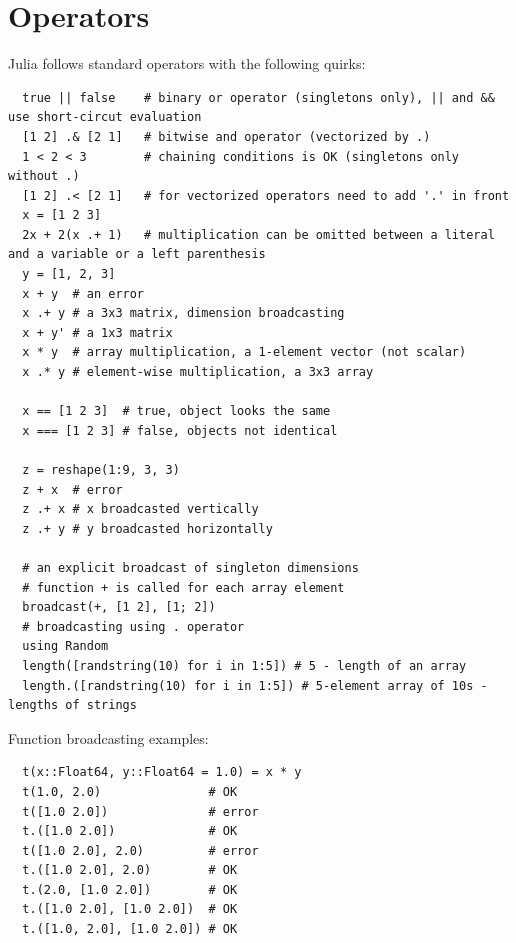 \documentclass[10pt,a4paper]{article}
\begin{document}
\section{Operators}
Julia follows standard operators with the following quirks:
\begin{lstlisting}
  true || false    # binary or operator (singletons only), || and && use short-circut evaluation
  [1 2] .& [2 1]   # bitwise and operator (vectorized by .)
  1 < 2 < 3        # chaining conditions is OK (singletons only without .)
  [1 2] .< [2 1]   # for vectorized operators need to add '.' in front
  x = [1 2 3]
  2x + 2(x .+ 1)   # multiplication can be omitted between a literal and a variable or a left parenthesis
  y = [1, 2, 3]
  x + y  # an error
  x .+ y # a 3x3 matrix, dimension broadcasting
  x + y' # a 1x3 matrix
  x * y  # array multiplication, a 1-element vector (not scalar)
  x .* y # element-wise multiplication, a 3x3 array

  x == [1 2 3]  # true, object looks the same
  x === [1 2 3] # false, objects not identical

  z = reshape(1:9, 3, 3)
  z + x  # error
  z .+ x # x broadcasted vertically
  z .+ y # y broadcasted horizontally

  # an explicit broadcast of singleton dimensions
  # function + is called for each array element
  broadcast(+, [1 2], [1; 2])
  # broadcasting using . operator
  using Random
  length([randstring(10) for i in 1:5]) # 5 - length of an array
  length.([randstring(10) for i in 1:5]) # 5-element array of 10s - lengths of strings
\end{lstlisting}

Function broadcasting examples:
\begin{lstlisting}
  t(x::Float64, y::Float64 = 1.0) = x * y
  t(1.0, 2.0)               # OK
  t([1.0 2.0])              # error
  t.([1.0 2.0])             # OK
  t([1.0 2.0], 2.0)         # error
  t.([1.0 2.0], 2.0)        # OK
  t.(2.0, [1.0 2.0])        # OK
  t.([1.0 2.0], [1.0 2.0])  # OK
  t.([1.0, 2.0], [1.0 2.0]) # OK
\end{lstlisting}
\end{document}
